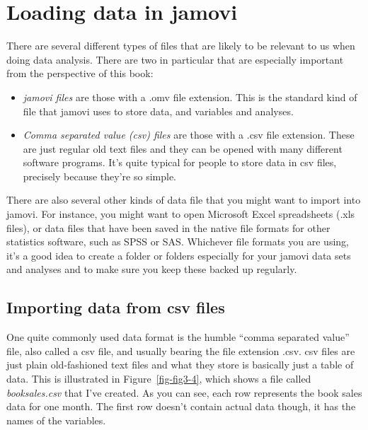 \documentclass[
  a4paper,
]{book}
\begin{document}
\hypertarget{loading-data-in-jamovi}{%
\section{Loading data in jamovi}\label{loading-data-in-jamovi}}

There are several different types of files that are likely to be
relevant to us when doing data analysis. There are two in particular
that are especially important from the perspective of this book:

\begin{itemize}
\item
  \emph{jamovi files} are those with a .omv file extension. This is the
  standard kind of file that jamovi uses to store data, and variables
  and analyses.
\item
  \emph{Comma separated value (csv) files} are those with a .csv file
  extension. These are just regular old text files and they can be
  opened with many different software programs. It's quite typical for
  people to store data in csv files, precisely because they're so
  simple.
\end{itemize}

There are also several other kinds of data file that you might want to
import into jamovi. For instance, you might want to open Microsoft Excel
spreadsheets (.xls files), or data files that have been saved in the
native file formats for other statistics software, such as SPSS or SAS.
Whichever file formats you are using, it's a good idea to create a
folder or folders especially for your jamovi data sets and analyses and
to make sure you keep these backed up regularly.

\hypertarget{importing-data-from-csv-files}{%
\subsection{Importing data from csv
files}\label{importing-data-from-csv-files}}

One quite commonly used data format is the humble ``comma separated
value'' file, also called a csv file, and usually bearing the file
extension .csv. csv files are just plain old-fashioned text files and
what they store is basically just a table of data. This is illustrated
in Figure~\ref{fig-fig3-4}, which shows a file called
\emph{booksales.csv} that I've created. As you can see, each row
represents the book sales data for one month. The first row doesn't
contain actual data though, it has the names of the variables.
\end{document}
